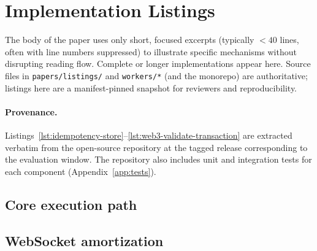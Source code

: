 \section{Implementation Listings}
\label{app:listings}

The body of the paper uses only short, focused excerpts (typically ${<}40$ lines, often with line numbers suppressed) to illustrate specific mechanisms without disrupting reading flow. Complete or longer implementations appear here. Source files in \texttt{papers/listings/} and \texttt{workers/*} (and the monorepo) are authoritative; listings here are a manifest-pinned snapshot for reviewers and reproducibility.

\paragraph{Provenance.} Listings~\ref{lst:idempotency-store}--\ref{lst:web3-validate-transaction} are extracted verbatim from the open-source repository at the tagged release corresponding to the evaluation window. The repository also includes unit and integration tests for each component (Appendix~\ref{app:tests}).

\subsection*{Core execution path}







\subsection*{WebSocket amortization}


